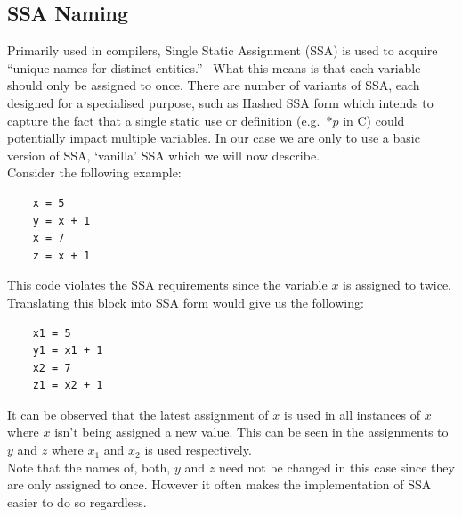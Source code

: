 \documentclass[12pt, titlepage]{article}
\begin{document}
\subsection{SSA Naming}
Primarily used in compilers, Single Static Assignment (SSA) is used to acquire ``unique names for distinct entities.''~\cite{ssaBook} What this means is that each variable should only be assigned to once. There are number of variants of SSA, each designed for a specialised purpose, such as Hashed SSA form which intends to capture the fact that a single static use or definition (e.g.\ $*p$ in C) could potentially impact multiple variables. In our case we are only to use a basic version of SSA, `vanilla' SSA which we will now describe. \\
Consider the following example:
\begin{lstlisting}
    x = 5
    y = x + 1
    x = 7
    z = x + 1
\end{lstlisting}
This code violates the SSA requirements since the variable $x$ is assigned to twice. Translating this block into SSA form would give us the following:
\begin{lstlisting}
    x1 = 5
    y1 = x1 + 1
    x2 = 7
    z1 = x2 + 1
\end{lstlisting}
It can be observed that the latest assignment of $x$  is used in all instances of $x$ where $x$ isn't being assigned a new value. This can be seen in the assignments to $y$ and $z$ where $x_1$ and $x_2$ is used respectively. \\
Note that the names of, both, $y$ and $z$ need not be changed in this case since they are only assigned to once. However it often makes the implementation of SSA easier to do so regardless.
\end{document}

